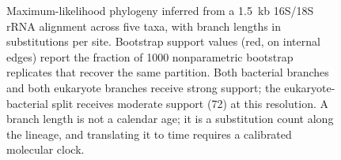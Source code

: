 \begin{figure}[htbp]
\caption[Phylogenetic tree]{Maximum-likelihood phylogeny inferred
from a 1.5~kb 16S/18S rRNA alignment across five taxa, with branch
lengths in substitutions per site. Bootstrap support values (red,
on internal edges) report the fraction of 1000 nonparametric
bootstrap replicates that recover the same partition. Both
bacterial branches and both eukaryote branches receive strong
support; the eukaryote-bacterial split receives moderate support
(72) at this resolution. A branch length is not a calendar age; it
is a substitution count along the lineage, and translating it to
time requires a calibrated molecular clock.}
\label{fig:vol06:ch11:phylo-tree}
\end{figure}
